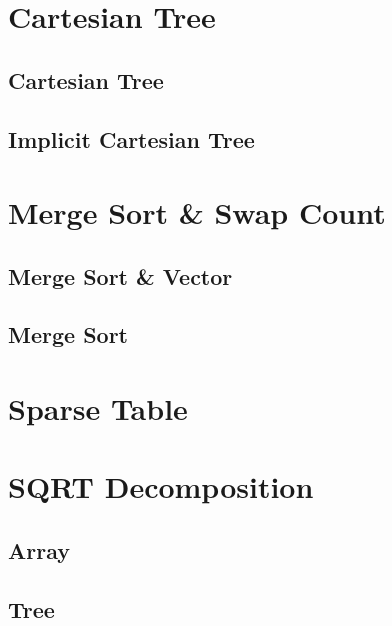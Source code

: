 \documentclass[10pt,a4paper]{report}
\begin{document}
	\section{Cartesian Tree}
		\subsection{Cartesian Tree}
			
		\subsection{Implicit Cartesian Tree}
			
			
	\section{Merge Sort \& Swap Count}
		\subsection{Merge Sort \& Vector}
			
		\subsection{Merge Sort}
			
			
	\section{Sparse Table}
		
		
	\section{SQRT Decomposition}
		\subsection{Array}
			
		\subsection{Tree}
			
	
\end{document}

